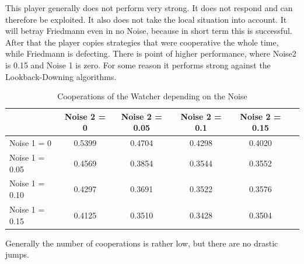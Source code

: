 This player generally does not perform very strong. It does not respond and can therefore be exploited. It also does not take the local situation into account. It will betray Friedmann even in no Noise, because in short term this is successful. After that the player copies strategies that were cooperative the whole time, while Friedmann is defecting. There is point of higher performance, where Noise2 is 0.15 and Noise 1 is zero. For some reason it performs strong against the Lookback-Downing algorithms.

\begin{table}[h]
 \begin{center}
\caption{Cooperations of the Watcher depending on the Noise} \vspace{3mm}
\begin{tabular}{|l|c|c|c|c|c|}
\hline
   	& Noise 2 = 0 & Noise 2 = 0.05& Noise 2 = 0.1& Noise 2 = 0.15 \\
  \hline
  Noise 1 = 0 	&       0.5399  &  0.4704  &  0.4298 &   0.4020 \\
 \hline
  Noise 1 = 0.05	 &        0.4569  &  0.3854 &   0.3544  & 0.3552 \\
 \hline
  Noise 1 = 0.10 	&         0.4297 &   0.3691  &  0.3522  &  0.3576 \\
 \hline
  Noise 1 = 0.15 	&       0.4125 &   0.3510&    0.3428  &  0.3504 \\
 \hline
\end{tabular}
 \end{center}
\end{table}

Generally the number of cooperations is rather low, but there are no drastic jumps.


\newpage

